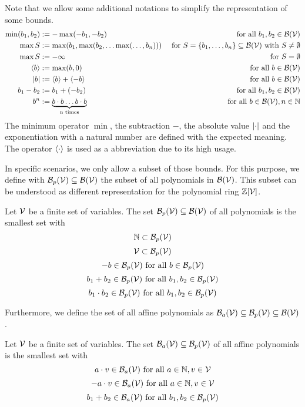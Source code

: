 Note that we allow some additional notations to simplify the representation of some bounds.
\begin{align*}
  \min(b_1,b_2) &:= -\max(-b_1,-b_2) & \text{ for all } b_1, b_2 \in \mathcal{B}(\mathcal{V}) \\
  \max S &:= \max(b_1, \max(b_2, \dots \max(\dots, b_n))) & \text{ for } S = \lbrace b_1, \dots, b_n \rbrace \subseteq \mathcal{B}(\mathcal{V}) \text{ with } S \neq \emptyset \\
  \max S &:= -\infty & \text{ for } S = \emptyset \\
  \langle b\rangle &:= \max(b,0) & \text{ for all } b \in \mathcal{B}(\mathcal{V}) \\
  \left|b\right| &:= \langle b\rangle + \langle-b\rangle & \text{ for all } b \in \mathcal{B}(\mathcal{V}) \\
  b_1 - b_2 &:= b_1 + (-b_2) & \text{ for all } b_1, b_2 \in \mathcal{B}(\mathcal{V}) \\
  b^n &:= \underbrace{b \cdot b \dots b \cdot b}_\text{n times} & \text{ for all } b \in \mathcal{B}(\mathcal{V}), n \in \mathbb{N}
\end{align*}
The minimum operator $\min$, the subtraction $-$, the absolute value $\left|\cdot\right|$ and the exponentiation with a natural number are defined with the expected meaning.
The operator $\langle\cdot\rangle$ is used as a abbreviation due to its high usage.

In specific scenarios, we only allow a subset of those bounds.
For this purpose, we define with $\mathcal{B}_p(\mathcal{V}) \subseteq \mathcal{B}(\mathcal{V})$ the subset of all polynomials in $\mathcal{B}(\mathcal{V})$.
This subset can be understood as different representation for the polynomial ring $\mathbb{Z}[\mathcal{V}]$.
\begin{definition}
  Let $\mathcal{V}$ be a finite set of variables.
  The set $\mathcal{B}_p(\mathcal{V}) \subseteq \mathcal{B}(\mathcal{V})$ of all polynomials is the smallest set with
  \[ \mathbb{N} \subset \mathcal{B}_p(\mathcal{V}) \] 
  \[ \mathcal{V} \subset \mathcal{B}_p(\mathcal{V}) \] 
  \[ -b \in \mathcal{B}_p(\mathcal{V}) \text{ for all } b \in \mathcal{B}_p(\mathcal{V}) \] 
  \[ b_1 + b_2 \in \mathcal{B}_p(\mathcal{V}) \text{ for all } b_1, b_2 \in \mathcal{B}_p(\mathcal{V}) \] 
  \[ b_1 \cdot b_2 \in \mathcal{B}_p(\mathcal{V}) \text{ for all } b_1, b_2 \in \mathcal{B}_p(\mathcal{V}) \] 
\end{definition}
Furthermore, we define the set of all affine polynomials as $\mathcal{B}_a(\mathcal{V}) \subseteq \mathcal{B}_p(\mathcal{V}) \subseteq \mathcal{B}(\mathcal{V})$. 
\begin{definition}
  Let $\mathcal{V}$ be a finite set of variables.
  The set $\mathcal{B}_a(\mathcal{V}) \subseteq \mathcal{B}_p(\mathcal{V})$ of all affine polynomials is the smallest set with
  \[ a \cdot v \in \mathcal{B}_a(\mathcal{V}) \text{ for all } a \in \mathbb{N}, v \in \mathcal{V} \] 
  \[ -a \cdot v \in \mathcal{B}_a(\mathcal{V}) \text{ for all } a \in \mathbb{N}, v \in \mathcal{V} \] 
  \[ b_1 + b_2 \in \mathcal{B}_a(\mathcal{V}) \text{ for all } b_1, b_2 \in \mathcal{B}_p(\mathcal{V}) \] 
\end{definition}

